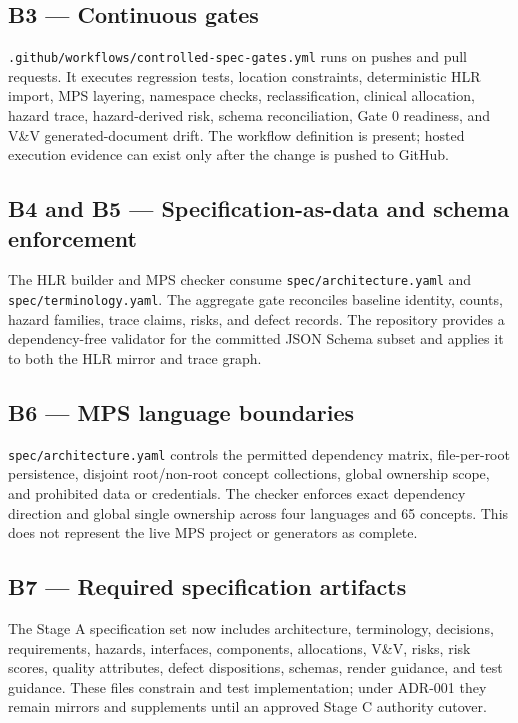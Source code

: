 \documentclass[11pt,letterpaper]{article}
\begin{document}
\subsection{B3 --- Continuous gates}

\nolinkurl{.github/workflows/controlled-spec-gates.yml} runs on pushes and pull requests. It executes regression tests, location constraints, deterministic HLR import, MPS layering, namespace checks, reclassification, clinical allocation, hazard trace, hazard-derived risk, schema reconciliation, Gate 0 readiness, and V\&V generated-document drift. The workflow definition is present; hosted execution evidence can exist only after the change is pushed to GitHub.

\subsection{B4 and B5 --- Specification-as-data and schema enforcement}

The HLR builder and MPS checker consume \nolinkurl{spec/architecture.yaml} and \nolinkurl{spec/terminology.yaml}. The aggregate gate reconciles baseline identity, counts, hazard families, trace claims, risks, and defect records. The repository provides a dependency-free validator for the committed JSON Schema subset and applies it to both the HLR mirror and trace graph.

\subsection{B6 --- MPS language boundaries}

\nolinkurl{spec/architecture.yaml} controls the permitted dependency matrix, file-per-root persistence, disjoint root/non-root concept collections, global ownership scope, and prohibited data or credentials. The checker enforces exact dependency direction and global single ownership across four languages and 65 concepts. This does not represent the live MPS project or generators as complete.

\subsection{B7 --- Required specification artifacts}

The Stage A specification set now includes architecture, terminology, decisions, requirements, hazards, interfaces, components, allocations, V\&V, risks, risk scores, quality attributes, defect dispositions, schemas, render guidance, and test guidance. These files constrain and test implementation; under ADR-001 they remain mirrors and supplements until an approved Stage C authority cutover.
\end{document}
